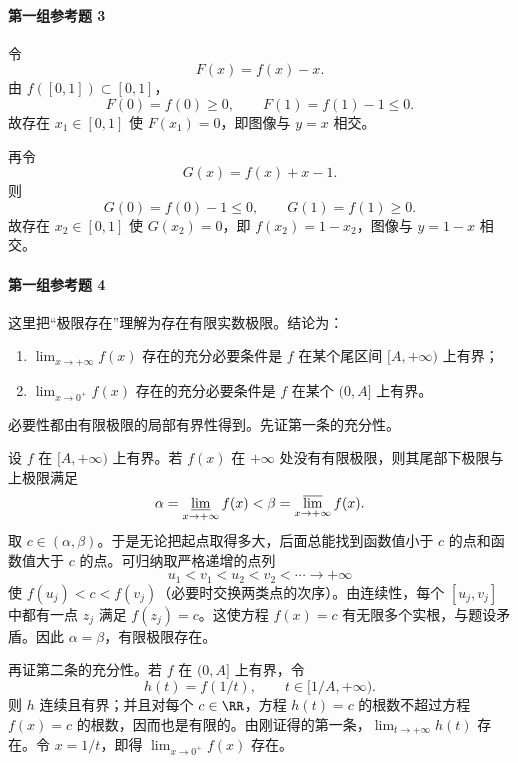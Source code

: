 \paragraph{第一组参考题 3}
\begin{xsolution}
令
\[
 F(x)=f(x)-x.
\]
由 $f([0,1])\subset[0,1]$，
\[
 F(0)=f(0)\ge0,
 \qquad F(1)=f(1)-1\le0.
\]
故存在 $x_1\in[0,1]$ 使 $F(x_1)=0$，即图像与 $y=x$ 相交。

再令
\[
 G(x)=f(x)+x-1.
\]
则
\[
 G(0)=f(0)-1\le0,
 \qquad G(1)=f(1)\ge0.
\]
故存在 $x_2\in[0,1]$ 使 $G(x_2)=0$，即 $f(x_2)=1-x_2$，图像与 $y=1-x$ 相交。
\end{xsolution}

\paragraph{第一组参考题 4}
\begin{xsolution}
这里把“极限存在”理解为存在有限实数极限。结论为：
\begin{enumerate}[label=(\arabic*)]
 \item $\lim_{x\to+\infty}f(x)$ 存在的充分必要条件是 $f$ 在某个尾区间 $[A,+\infty)$ 上有界；
 \item $\lim_{x\to0^+}f(x)$ 存在的充分必要条件是 $f$ 在某个 $(0,A]$ 上有界。
\end{enumerate}
必要性都由有限极限的局部有界性得到。先证第一条的充分性。

设 $f$ 在 $[A,+\infty)$ 上有界。若 $f(x)$ 在 $+\infty$ 处没有有限极限，则其尾部下极限与上极限满足
\[
 \alpha=\varliminf_{x\to+\infty}f(x)
 <
 \beta=\varlimsup_{x\to+\infty}f(x).
\]
取 $c\in(\alpha,\beta)$。于是无论把起点取得多大，后面总能找到函数值小于 $c$ 的点和函数值大于 $c$ 的点。可归纳取严格递增的点列
\[
 u_1<v_1<u_2<v_2<\cdots\to+\infty
\]
使 $f(u_j)<c<f(v_j)$（必要时交换两类点的次序）。由连续性，每个 $[u_j,v_j]$ 中都有一点 $z_j$ 满足 $f(z_j)=c$。这使方程 $f(x)=c$ 有无限多个实根，与题设矛盾。因此 $\alpha=\beta$，有限极限存在。

再证第二条的充分性。若 $f$ 在 $(0,A]$ 上有界，令
\[
 h(t)=f(1/t),
 \qquad t\in[1/A,+\infty).
\]
则 $h$ 连续且有界；并且对每个 $c\in\RR$，方程 $h(t)=c$ 的根数不超过方程 $f(x)=c$ 的根数，因而也是有限的。由刚证得的第一条，$\lim_{t\to+\infty}h(t)$ 存在。令 $x=1/t$，即得 $\lim_{x\to0^+}f(x)$ 存在。
\end{xsolution}

